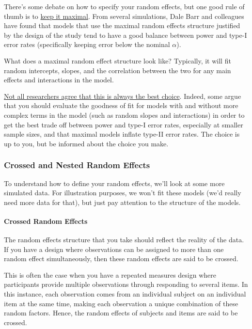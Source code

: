\documentclass[
]{book}
\begin{document}
There's some debate on how to specify your random effects, but one good rule of thumb is to \href{https://www.sciencedirect.com/science/article/pii/S0749596X12001180}{keep it maximal}. From several simulations, Dale Barr and colleagues have found that models that use the maximal random effects structure justified by the design of the study tend to have a good balance between power and type-I error rates (specifically keeping error below the nominal \(\alpha\)).

What does a maximal random effect structure look like? Typically, it will fit random intercepts, slopes, and the correlation between the two for any main effects and interactions in the model.

\href{https://www.sciencedirect.com/science/article/pii/S0749596X17300013}{Not all researchers agree that this is always the best choice}. Indeed, some argue that you should evaluate the goodness of fit for models with and without more complex terms in the model (such as random slopes and interactions) in order to get the best trade off between power and type-I error rates, especially at smaller sample sizes, and that maximal models inflate type-II error rates. The choice is up to you, but be informed about the choice you make.

\hypertarget{crossed-and-nested-random-effects}{%
\subsubsection{Crossed and Nested Random Effects}\label{crossed-and-nested-random-effects}}

To understand how to define your random effects, we'll look at some more simulated data. For illustration purposes, we won't fit these models (we'd really need more data for that), but just pay attention to the structure of the models.

\hypertarget{crossed-random-effects}{%
\paragraph{Crossed Random Effects}\label{crossed-random-effects}}

The random effects structure that you take should reflect the reality of the data. If you have a design where observations can be assigned to more than one random effect simultaneously, then these random effects are said to be crossed.

This is often the case when you have a repeated measures design where participants provide multiple observations through responding to several items. In this instance, each observation comes from an individual subject on an individual item at the same time, making each observation a unique combination of these random factors. Hence, the random effects of subjects and items are said to be crossed.
\end{document}
